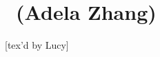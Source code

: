 \renewcommand{\thespeaker}{Adela Zhang}
\renewcommand{\thetitle}{}
\section{\thetitle~(\thespeaker)}
\providecommand{\Supp}{\text{Supp}}

[tex'd by Lucy]
